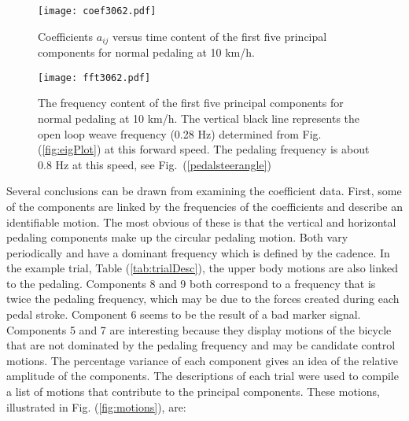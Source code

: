 \documentclass[smallextended]{svjour3}     %
\begin{document}
\begin{figure}[tb]
    \begin{center}
        \texttt{[image: coef3062.pdf]}
    \end{center}
    \caption{Coefficients $a_{ij}$ versus time content of the first five
    principal components for normal pedaling at 10 km/h.}
    \label{fig:coef3062}
\end{figure}
\begin{figure}[tb]
    \begin{center}
        \texttt{[image: fft3062.pdf]}
    \end{center}
    \caption{The frequency
    content of the first five principal components for normal pedaling at 10
    km/h. The vertical black line represents the open loop weave frequency
    (0.28 Hz) determined from Fig. (\ref{fig:eigPlot}) at this forward speed.
    The pedaling frequency is about 0.8 Hz at this speed, see
    Fig.~(\ref{pedalsteerangle})}
    \label{fig:fft3062}
\end{figure}
Several conclusions can be drawn from examining the coefficient data. First,
some of the components are linked by the frequencies of the coefficients
and describe an identifiable motion. The most obvious of these is that the vertical
and horizontal pedaling components make up the circular pedaling motion.
Both vary periodically and have a dominant frequency which is defined by the
cadence. In the example trial, Table (\ref{tab:trialDesc}), the upper body
motions are also linked to the pedaling. Components 8 and 9 both correspond to
a frequency that is twice the pedaling frequency, which may be due to the
forces created during each pedal stroke. Component 6 seems to be the result of a
bad marker signal. Components 5 and 7 are interesting because they display
motions of the bicycle that are not dominated by the pedaling frequency and may
be candidate control motions. The percentage variance of each component gives
an idea of the relative amplitude of the components. The descriptions of each
trial were used to compile a list of motions that contribute to the principal
components. These motions, illustrated in Fig. (\ref{fig:motions}), are:
\end{document}
